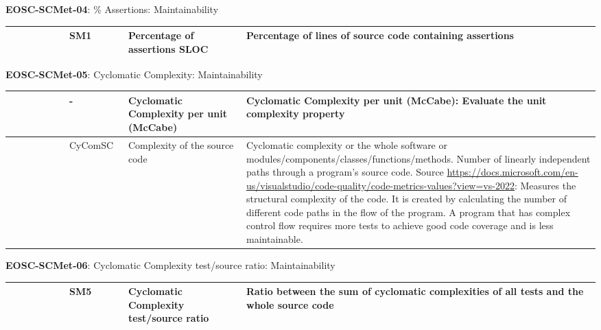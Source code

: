 \textbf{EOSC-SCMet-04}: \% Assertions: Maintainability
\nopagebreak[4]
\begin{center}
    \tabletail{\hline}
    \tiny
    \begin{supertabular}{|p{0.10\linewidth}|p{0.10\linewidth}|p{0.20\linewidth}|p{0.60\linewidth}|} \hline
        \cite{nagappan_early_2005} & SM1 & Percentage of assertions SLOC & Percentage of lines of source code containing assertions\\ \hline
    \end{supertabular}
\end{center}

\textbf{EOSC-SCMet-05}: Cyclomatic Complexity: Maintainability
\nopagebreak[4]
\begin{center}
    \tabletail{\hline}
    \tiny
    \begin{supertabular}{|p{0.10\linewidth}|p{0.10\linewidth}|p{0.20\linewidth}|p{0.60\linewidth}|} \hline
        \cite{srisopha_software_2018} & - & Cyclomatic Complexity per unit (McCabe) & Cyclomatic Complexity per unit (McCabe): Evaluate the unit complexity property\\ \hline
        \cite{montagud_systematic_2012} & CyComSC & Complexity of the source code & Cyclomatic complexity or the whole software or modules/components/classes/functions/methods. Number of linearly independent paths through a program's source code. Source \url{https://docs.microsoft.com/en-us/visualstudio/code-quality/code-metrics-values?view=vs-2022}: Measures the structural complexity of the code. It is created by calculating the number of different code paths in the flow of the program. A program that has complex control flow requires more tests to achieve good code coverage and is less maintainable.\\ \hline
    \end{supertabular}
\end{center}

\textbf{EOSC-SCMet-06}: Cyclomatic Complexity test/source ratio: Maintainability
\nopagebreak[4]
\begin{center}
    \tabletail{\hline}
    \tiny
    \begin{supertabular}{|p{0.10\linewidth}|p{0.10\linewidth}|p{0.20\linewidth}|p{0.60\linewidth}|} \hline
        \cite{nagappan_early_2005} & SM5 & Cyclomatic Complexity test/source ratio & Ratio between the sum of cyclomatic complexities of all tests and the whole source code\\ \hline
    \end{supertabular}
\end{center}

